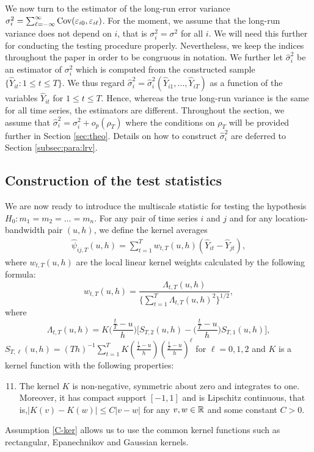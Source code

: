 \documentclass[a4paper,12pt]{article}
\begin{document}
We now turn to the estimator of the long-run error variance $\sigma_i^2 = \sum\nolimits_{\ell=-\infty}^{\infty} \textnormal{Cov}(\varepsilon_{i0}, \varepsilon_{i\ell})$. For the moment, we assume that the long-run variance does not depend on $i$, that is $\sigma_i^2 = \sigma^2$ for all $i$. We will need this further for conducting the testing procedure properly. Nevertheless, we keep the indices throughout the paper in order to be congruous in notation. We further let $\widehat{\sigma}_i^2$ be an estimator of $\sigma_i^2$ which is computed from the constructed sample $\{ \widehat{Y}_{it}: 1 \le t \le T \}$. We thus regard $\widehat{\sigma}_i^2 = \widehat{\sigma}_i^2(\widehat{Y}_{i1},\ldots,\widehat{Y}_{iT})$ as a function of the variables $\widehat{Y}_{it}$ for $1 \le t \le T$. Hence, whereas the true long-run variance is the same for all time series, the estimators are different. Throughout the section, we assume that $\widehat{\sigma}_i^2 = \sigma_i^2 + o_p(\rho_T)$ where the conditions on $\rho_T$ will be provided further in Section \ref{sec:theo}. Details on how to construct $\widehat{\sigma}_i^2$ are deferred to Section \ref{subsec:para:lrv}. 

\subsection{Construction of the test statistics}\label{subsec:test:stat}

We are now ready to introduce the multiscale statistic for testing the hypothesis $H_0: m_1 = m_2 = \ldots = m_n$. For any pair of time series $i$ and $j$ and for any location-bandwidth pair $(u, h)$, we define the kernel averages
\begin{align}\label{eq:psi_hat_ij}
 \widehat{\psi}_{ij,T}(u,h) = \sum\limits_{t=1}^T w_{t,T}(u,h)(\widehat{Y}_{it} - \widehat{Y}_{jt}),
 \end{align}
where $w_{t,T}(u,h)$ are the local linear kernel weights calculated by the following formula:
\begin{equation}\label{eq:weights}
w_{t,T}(u,h) = \frac{\Lambda_{t,T}(u,h)}{ \{\sum\nolimits_{t=1}^T \Lambda_{t,T}(u,h)^2 \}^{1/2} }, 
\end{equation}
where
\[ \Lambda_{t,T}(u,h) = K\Big(\frac{\frac{t}{T}-u}{h}\Big) \Big[ S_{T,2}(u,h) - \Big(\frac{\frac{t}{T}-u}{h}\Big) S_{T,1}(u,h) \Big], \]
$S_{T,\ell}(u,h) = (Th)^{-1} \sum\nolimits_{t=1}^T K(\frac{\frac{t}{T}-u}{h}) (\frac{\frac{t}{T}-u}{h})^\ell$ for $\ell = 0,1,2$ and $K$ is a kernel function with the following properties: 
\begin{enumerate}[label=(C\arabic*),leftmargin=1.05cm]
\setcounter{enumi}{10}
\item \label{C-ker} The kernel $K$ is non-negative, symmetric about zero and integrates to one. Moreover, it has compact support $[-1,1]$ and is Lipschitz continuous, that is,\linebreak $|K(v) - K(w)| \le C |v-w|$ for any $v,w \in \mathbb{R}$ and some constant $C > 0$. 
\end{enumerate} 
Assumption \ref{C-ker} allows us to use the common kernel functions such as rectangular, Epanechnikov and Gaussian kernels.
\end{document}
